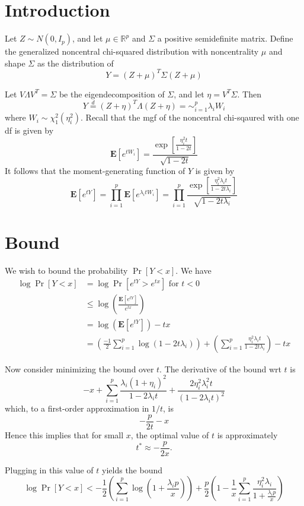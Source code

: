 \documentclass[12pt]{article}
\begin{document}
\maketitle

\newcommand{\tr}{\text{tr}}
\newcommand{\E}{\textbf{E}}
\newcommand{\diag}{\text{diag}}
\newcommand{\argmax}{\text{argmax}}
\newcommand{\Cov}{\text{Cov}}
\newcommand{\Var}{\text{Var}}
\newcommand{\argmin}{\text{argmin}}
\newcommand{\Vol}{\text{Vol}}
\newcommand{\comm}[1]{}

\section{Introduction}

Let $Z \sim N(0, I_p)$, and let $\mu \in \mathbb{R}^p$ and $\Sigma$ a
positive semidefinite matrix.  Define the generalized noncentral
chi-squared distribution with noncentrality $\mu$ and shape $\Sigma$
as the distribution of
\[
Y = (Z + \mu)^T \Sigma (Z + \mu)
\]

Let $V\Lambda V^T = \Sigma$ be the eigendecomposition of $\Sigma$,
and let $\eta = V^T \Sigma$.
Then
\[
Y \stackrel{d}{=} (Z + \eta)^T \Lambda (Z+\eta) = \sim_{i=1}^p \lambda_i W_i
\]
where $W_i \sim \chi^2_1(\eta_i^2)$.
Recall that the mgf of the noncentral chi-sqaured with one df is given by
\[
\E[e^{tW_i}] = \frac{\exp[\frac{\eta_i^2 t}{1-2t}]}{\sqrt{1-2t}}
\]
It follows that the moment-generating function of $Y$ is given by
\[
\E[e^{tY}] = \prod_{i=1}^p \E[e^{\lambda_i t W_i}] = \prod_{i=1}^p \frac{\exp[\frac{\eta_i^2 \lambda_i t}{1-2t \lambda_i}]}{\sqrt{1-2t \lambda_i}}
\]

\section{Bound}

We wish to bound the probability $\Pr[Y < x]$.
We have
\begin{align*}
\log \Pr[Y < x] &= \log \Pr[e^{tY} > e^{tx}]\text{ for }t < 0
\\&\leq \log\left(\frac{\E[e^{tY}]}{e^{tx}}\right)
\\&= \log(\E[e^{tY}]) - tx
\\&= \left(\frac{-1}{2} \sum_{i=1}^p \log(1 - 2t\lambda_i)\right) + \left(\sum_{i=1}^p \frac{\eta_i^2 \lambda_i t}{1 - 2t\lambda_i }\right) - tx
\end{align*}

Now consider minimizing the bound over $t$.
The derivative of the bound wrt $t$ is
\[
-x + \sum_{i=1}^p \frac{\lambda_i (1 + \eta_i)^2}{1-2\lambda_i t} + \frac{2\eta_i^2 \lambda_i^2 t}{(1-2\lambda_i t)^2}
\]
which, to a first-order approximation in $1/t$, is
\[
-\frac{p}{2t} - x
\]
Hence this implies that for small $x$, the optimal value of $t$ is approximately
\[
t^* \approx -\frac{p}{2x}.
\]

Plugging in this value of $t$ yields the bound
\[
\log \Pr[Y < x] < -\frac{1}{2}\left(\sum_{i=1}^p \log\left(1 + \frac{\lambda_i p}{x}\right)\right) + 
\frac{p}{2} \left(1 - \frac{1}{x}\sum_{i=1}^p \frac{\eta_i^2 \lambda_i}{1 + \frac{\lambda_i p}{x}}\right)
\]
\end{document}
